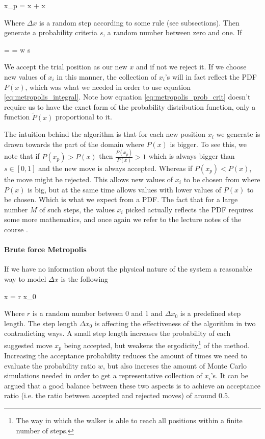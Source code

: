 \eqs x_p = x + \Delta x \eqf

Where $\Delta x$ is a random step according to some rule (see subsections).
Then generate a probability criteria $s$, a random number between zero and one. 
If 

\eqs {} =  =  \equiv w \geq s 
\label{eq:metropolis_prob_crit}\eqf

We accept the trial position as our new $x$ and if not we reject it. 
If we choose new values of $x_i$ in this manner, the collection of $x_i$'s will in fact reflect the PDF $P(x)$, which was what we needed in order to use equation \ref{eq:metropolis_integral}. 
Note how equation \ref{eq:metropolis_prob_crit} doesn't require us to have the exact form of the probability distribution function, only a function $\tilde{P}(x)$ proportional to it. 

The intuition behind the algorithm is that for each new position $x_i$ we generate is drawn towards the part of the domain where $P(x)$ is bigger. 
To see this, we note that if $P(x_p) > P(x)$ then $\frac{P(x_p)}{P(x)}>1$ which is always bigger than $s \in [0,1]$ and the new move is always accepted.
Whereas if $P(x_p)<P(x)$, the move might be rejected. 
This allows new values of $x_i$ to be chosen from where $P(x)$ is big, but at the same time allows values with lower values of $P(x)$ to be chosen. 
Which is what we expect from a PDF. 
The fact that for a large number $M$ of such steps, the values $x_i$ picked actually reflects the PDF requires some more mathematics, and once again we refer to the lecture notes of the course \cite{lecturenotes}.



\paragraph{Brute force Metropolis}

If we have no information about the physical nature of the system a reasonable way to model $\Delta x$ is the following

\eqs
\Delta x = r \Delta x_0
\eqf

Where $r$ is a random number between $0$ and $1$ and $\Delta x_0$ is a predefined step length. 
The step length $\Delta x_0$ is affecting the effectiveness of the algorithm in two contradicting ways. 
A small step length increases the probability of each suggested move $x_p$ being accepted, but weakens the ergodicity\footnote{The way in which the walker is able to reach all positions within a finite number of steps.}
of the method. 
Increasing the acceptance probability reduces the amount of times we need to evaluate the probability ratio $w$, but also increses the amount of Monte Carlo simulations needed in order to get a representative collection of $x_i$'s. 
It can be argued that a good balance between these two aspects is to achieve an acceptance ratio 
(i.e. the ratio between accepted and rejected moves) of around $0.5$. 

